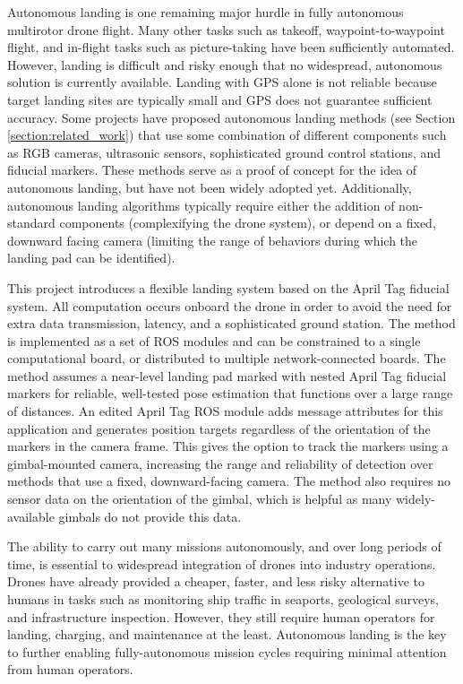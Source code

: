 Autonomous landing is one remaining major hurdle in fully autonomous multirotor drone flight.
Many other tasks such as takeoff, waypoint-to-waypoint flight, and in-flight tasks such as picture-taking have been
sufficiently automated.
However, landing is difficult and risky enough that no widespread, autonomous solution is currently available.
Landing with GPS alone is not reliable because target landing sites are typically small and GPS does not guarantee sufficient accuracy.
Some projects have proposed autonomous landing methods (see Section \ref{section:related_work})
that use some combination of different components such as RGB cameras, ultrasonic sensors,
sophisticated ground control stations, and fiducial markers.
These methods serve as a proof of concept for the idea of autonomous landing, but have not been widely adopted yet.
{\color{red}Additionally, autonomous landing algorithms typically require either the addition of non-standard components (complexifying the drone system),
or depend on a fixed, downward facing camera (limiting the range of behaviors during which the landing pad can be identified).}


This project introduces a flexible landing system based on the April Tag\cite{apriltag3_paper} fiducial system.
All computation occurs onboard the drone in order to avoid the need for extra data transmission, latency, and a
sophisticated ground station.
The method is implemented as a set of ROS modules and can be constrained to a single computational board,
or distributed to multiple network-connected boards.
The method assumes a near-level landing pad marked with nested April Tag fiducial markers for reliable, well-tested
pose estimation that functions over a large range of distances.
An edited April Tag ROS module adds message attributes for this application and generates position targets
regardless of the orientation of the markers in the camera frame.
This gives the option to track the markers using a gimbal-mounted camera,
increasing the range and reliability of detection over methods that use a fixed, downward-facing camera.
The method also requires no sensor data on the orientation of the gimbal, which is helpful as many widely-available
gimbals do not provide this data.

The ability to carry out many missions autonomously, and over long periods of time,
is essential to widespread integration of drones into industry operations.
Drones have already provided a cheaper, faster, and less risky alternative to humans in tasks such as
monitoring ship traffic in seaports\cite{security_integration},
geological surveys\cite{eit},
and infrastructure inspection.\cite{maritine_infrastructure_inspection}
However, they still require human operators for landing, charging, and maintenance at the least.
Autonomous landing is the key to further enabling fully-autonomous mission cycles requiring minimal attention from human operators.
